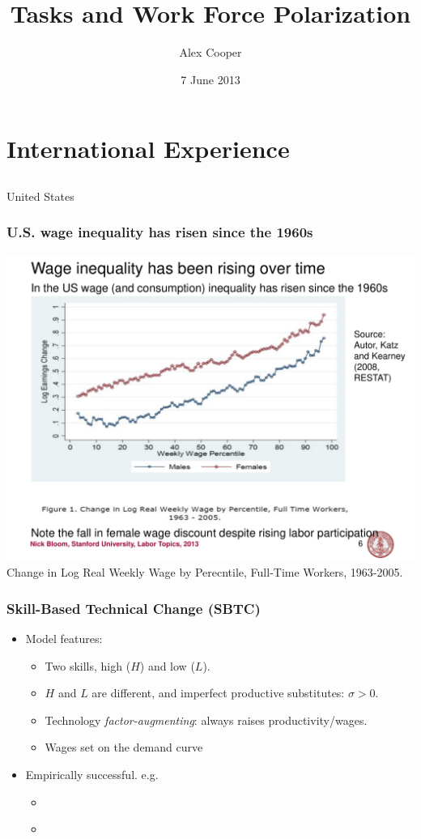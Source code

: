 \documentclass[red]{beamer}
\title[Polarization and Tasks]{Tasks and Work Force Polarization}
\author{Alex Cooper}
\date{7 June 2013}
\begin{document}
%
\begin{frame}
\titlepage
\end{frame}
%
\section{International Experience}
\subsection{}

\begin{frame}[t]{United States}
\frametitle{U.S. wage inequality has risen since the 1960s}
\begin{center}
  \includegraphics[width=\textwidth]{slides/katz_kearney_2008_log_e_chg.pdf}
  \\
  Change in Log Real Weekly Wage by Perecntile, Full-Time Workers, 1963-2005.
  \citep{Autor2008}
\end{center}
\end{frame}

\begin{frame}
\frametitle{Skill-Based Technical Change (SBTC)}
\begin{itemize}
\item Model features:
\begin{itemize}
\item Two skills, high ($H$) and low ($L$).
\item $H$ and $L$ are different, and imperfect productive substitutes: $\sigma>0$.
\item Technology \emph{factor-augmenting}: always raises productivity/wages.
\item Wages set on the demand curve
\end{itemize}
\item Empirically successful. e.g.
  \begin{itemize}
  \item \citet{Katz1992}
  \item \citet{Card2001}
  \end{itemize}
\end{itemize}
\end{frame}
\end{document}
